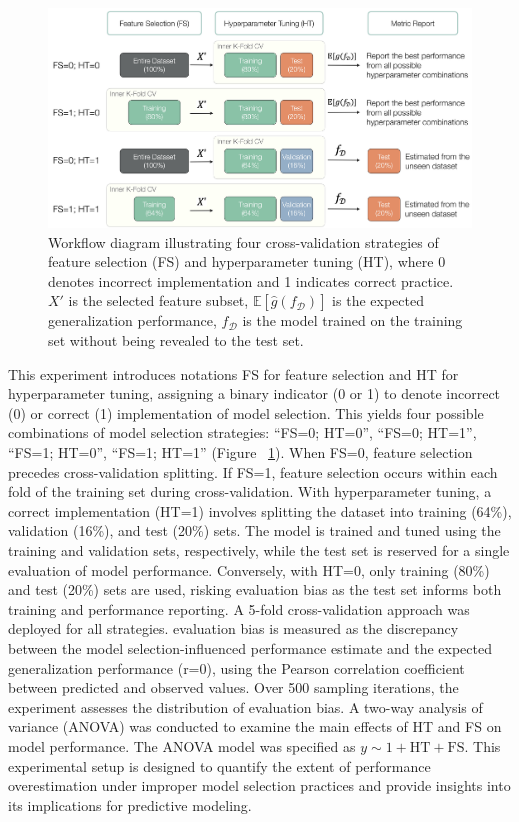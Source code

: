 \begin{figure}[H]
    \centering
    \includegraphics[width=1\textwidth]{fig_s2_schemes.jpg}
    \caption{Workflow diagram illustrating four cross-validation strategies of feature selection (FS) and hyperparameter tuning (HT), where 0 denotes incorrect implementation and 1 indicates correct practice. $X'$ is the selected feature subset, $\mathbb{E}[\hat{g}(f_\mathcal{D})]$ is the expected generalization performance, $f_\mathcal{D}$ is the model trained on the training set without being revealed to the test set.}
    \label{fig:s2_schemes}
\end{figure}

This experiment introduces notations FS for feature selection and HT for hyperparameter tuning, assigning a binary indicator (0 or 1) to denote incorrect (0) or correct (1) implementation of model selection. This yields four possible combinations of model selection strategies: “FS=0; HT=0”, “FS=0; HT=1”, “FS=1; HT=0”, “FS=1; HT=1” (Figure ~\ref{fig:s2_schemes}). When FS=0, feature selection precedes cross-validation splitting. If FS=1, feature selection occurs within each fold of the training set during cross-validation. With hyperparameter tuning, a correct implementation (HT=1) involves splitting the dataset into training (64\%), validation (16\%), and test (20\%) sets. The model is trained and tuned using the training and validation sets, respectively, while the test set is reserved for a single evaluation of model performance. Conversely, with HT=0, only training (80\%) and test (20\%) sets are used, risking evaluation bias as the test set informs both training and performance reporting. A 5-fold cross-validation approach was deployed for all strategies.
evaluation bias is measured as the discrepancy between the model selection-influenced performance estimate and the expected generalization performance (r=0), using the Pearson correlation coefficient between predicted and observed values. Over 500 sampling iterations, the experiment assesses the distribution of evaluation bias. A two-way analysis of variance (ANOVA) was conducted to examine the main effects of HT and FS on model performance. The ANOVA model was specified as $y \sim 1 + \text{HT} + \text{FS}$. This experimental setup is designed to quantify the extent of performance overestimation under improper model selection practices and provide insights into its implications for predictive modeling.
